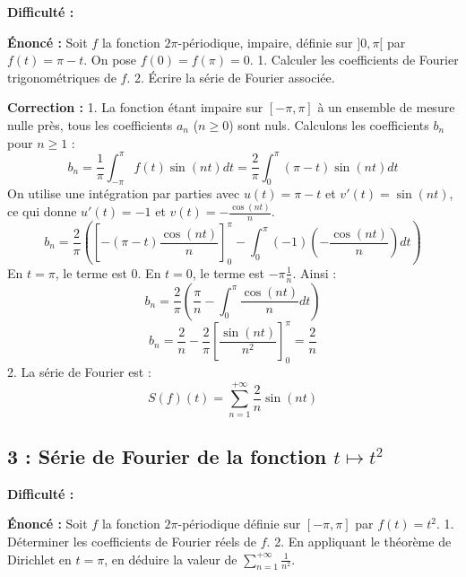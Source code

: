 \documentclass[12pt,a4paper]{article}
\begin{document}
\textbf{Difficulté :} \bigstar\star\star\star\star

\textbf{Énoncé :}
Soit $f$ la fonction $2\pi$-périodique, impaire, définie sur $]0, \pi[$ par $f(t) = \pi - t$. On pose $f(0) = f(\pi) = 0$.
1. Calculer les coefficients de Fourier trigonométriques de $f$.
2. Écrire la série de Fourier associée.

\textbf{Correction :}
1. La fonction étant impaire sur $[-\pi, \pi]$ à un ensemble de mesure nulle près, tous les coefficients $a_n$ ($n \ge 0$) sont nuls.
   Calculons les coefficients $b_n$ pour $n \ge 1$ :
   $$b_n = \frac{1}{\pi} \int_{-\pi}^\pi f(t) \sin(nt) dt = \frac{2}{\pi} \int_0^\pi (\pi - t) \sin(nt) dt$$
   On utilise une intégration par parties avec $u(t) = \pi - t$ et $v'(t) = \sin(nt)$, ce qui donne $u'(t) = -1$ et $v(t) = -\frac{\cos(nt)}{n}$.
   $$b_n = \frac{2}{\pi} \left( \left[ -(\pi - t) \frac{\cos(nt)}{n} \right]_0^\pi - \int_0^\pi (-1) \left(-\frac{\cos(nt)}{n}\right) dt \right)$$
   En $t=\pi$, le terme est $0$. En $t=0$, le terme est $-\pi \frac{1}{n}$. Ainsi :
   $$b_n = \frac{2}{\pi} \left( \frac{\pi}{n} - \int_0^\pi \frac{\cos(nt)}{n} dt \right)$$
   $$b_n = \frac{2}{n} - \frac{2}{\pi} \left[ \frac{\sin(nt)}{n^2} \right]_0^\pi = \frac{2}{n}$$
2. La série de Fourier est :
   $$S(f)(t) = \sum_{n=1}^{+\infty} \frac{2}{n} \sin(nt)$$


\subsection*{3 : Série de Fourier de la fonction $t \mapsto t^2$}

\textbf{Difficulté :} \bigstar\bigstar\star\star\star

\textbf{Énoncé :}
Soit $f$ la fonction $2\pi$-périodique définie sur $[-\pi, \pi]$ par $f(t) = t^2$.
1. Déterminer les coefficients de Fourier réels de $f$.
2. En appliquant le théorème de Dirichlet en $t=\pi$, en déduire la valeur de $\sum_{n=1}^{+\infty} \frac{1}{n^2}$.
\end{document}
